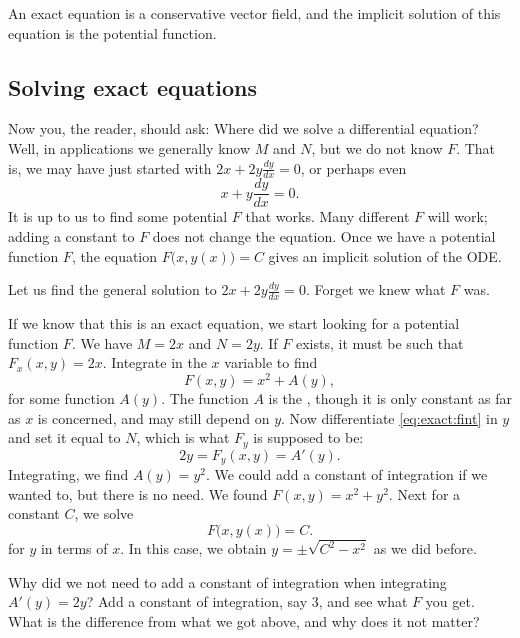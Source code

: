 An exact equation is a conservative vector field, and the implicit
solution of this equation is the potential function.

\subsection{Solving exact equations}

Now you, the reader, should ask: Where did we solve a differential equation?
Well, in applications we generally know $M$ and $N$, but we do not
know $F$.  That is, we may have just started with
$2x + 2y \frac{dy}{dx} = 0$, or perhaps even
\begin{equation*}
x + y \frac{dy}{dx} = 0 .
\end{equation*}
It is up to us to find some potential $F$ that works.  Many different $F$
will work; adding a constant to $F$ does not change the equation.
Once we have a potential function $F$, the equation 
$F\bigl(x,y(x)\bigr) = C$
gives an implicit solution of the ODE\@.

\begin{example}
Let us find the general solution to
$2x + 2y \frac{dy}{dx} = 0$.  Forget we knew
what $F$ was.

If we know that this is an exact equation, we start looking for a potential
function $F$.
We have $M = 2x$ and $N=2y$.
If $F$ exists, it must be such that
$F_x (x,y) = 2x$.
Integrate in the $x$ variable to find
\begin{equation} \label{eq:exact:fint}
F(x,y) = x^2 + A(y) ,
\end{equation}
for some function $A(y)$.  The function $A$ is the , though it is only constant as far as $x$ is concerned, and
may still depend on $y$.  Now differentiate \eqref{eq:exact:fint} in $y$ 
and set it equal to $N$, which is what $F_y$ is supposed to be:
\begin{equation*}
2y = F_y (x,y) = A'(y) .
\end{equation*}
Integrating, we find $A(y) = y^2$.  We could add a constant of integration
if we wanted to, but there is no need.  We found $F(x,y) = x^2+y^2$.
Next for a constant $C$, we solve
\begin{equation*}
F\bigl(x,y(x)\bigr) = C .
\end{equation*}
for $y$ in terms of $x$.  In this case, we obtain $y = \pm \sqrt{C^2-x^2}$
as we did before.
\end{example}

\begin{exercise}
Why did we not need to add a constant of integration when integrating $A'(y)
= 2y$?  Add a constant of integration, say $3$, and see what $F$ you get.
What is the difference from what we got above, and why does it not matter?
\end{exercise}



